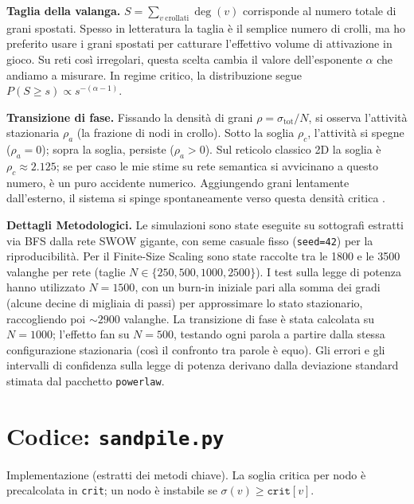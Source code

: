 \documentclass[10pt,a4paper]{article}
\begin{document}
\textbf{Taglia della valanga.} $S=\sum_{v\ \text{crollati}}\deg(v)$ corrisponde al numero totale di grani spostati. Spesso in letteratura la taglia è il semplice numero di crolli, ma ho preferito usare i grani spostati per catturare l'effettivo volume di attivazione in gioco. Su reti così irregolari, questa scelta cambia il valore dell'esponente $\alpha$ che andiamo a misurare. In regime critico, la distribuzione segue $P(S\ge s)\propto s^{-(\alpha-1)}$.

\textbf{Transizione di fase.} Fissando la densità di grani $\rho=\sigma_{\text{tot}}/N$, si osserva l'attività stazionaria $\rho_a$ (la frazione di nodi in crollo). Sotto la soglia $\rho_c$, l'attività si spegne ($\rho_a=0$); sopra la soglia, persiste ($\rho_a>0$). Sul reticolo classico 2D la soglia è $\rho_c\approx 2.125$; se per caso le mie stime su rete semantica si avvicinano a questo numero, è un puro accidente numerico. Aggiungendo grani lentamente dall'esterno, il sistema si spinge spontaneamente verso questa densità critica \cite{dickman2000}.

\textbf{Dettagli Metodologici.} Le simulazioni sono state eseguite su sottografi estratti via BFS dalla rete SWOW gigante, con seme casuale fisso (\texttt{seed=42}) per la riproducibilità. Per il Finite-Size Scaling sono state raccolte tra le 1800 e le 3500 valanghe per rete (taglie $N \in \{250, 500, 1000, 2500\}$). I test sulla legge di potenza hanno utilizzato $N=1500$, con un burn-in iniziale pari alla somma dei gradi (alcune decine di migliaia di passi) per approssimare lo stato stazionario, raccogliendo poi $\sim 2900$ valanghe. La transizione di fase è stata calcolata su $N=1000$; l'effetto fan su $N=500$, testando ogni parola a partire dalla stessa configurazione stazionaria (così il confronto tra parole è equo). Gli errori e gli intervalli di confidenza sulla legge di potenza derivano dalla deviazione standard stimata dal pacchetto \texttt{powerlaw}.

\section{Codice: \texttt{sandpile.py}}

Implementazione (estratti dei metodi chiave). La soglia critica per nodo è precalcolata in
\texttt{crit}; un nodo è instabile se $\sigma(v)\ge\texttt{crit}[v]$.
\end{document}
